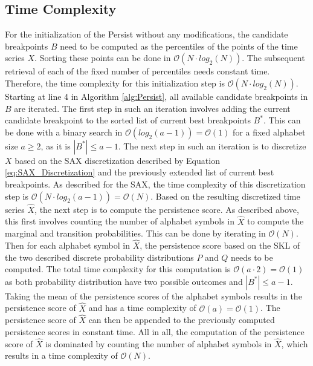 \subsection*{Time Complexity}
For the initialization of the Persist without any modifications, the candidate breakpoints $B$ need to be computed as the percentiles of the points of the time series $X$. Sorting these points can be done in $\mathcal{O}(N \cdot log_{2}(N))$. The subsequent retrieval of each of the fixed number of percentiles needs constant time. Therefore, the time complexity for this initialization step is $\mathcal{O}(N \cdot log_{2}(N))$. \newline
Starting at line 4 in Algorithm \ref{alg:Persist}, all available candidate breakpoints in $B$ are iterated.
The first step in such an iteration involves adding the current candidate breakpoint to the sorted list of current best breakpoints $B^*$. This can be done with a binary search in $\mathcal{O}(log_{2}(a-1)) = \mathcal{O}(1)$ for a fixed alphabet size $a \geq 2$, as it is $|B^*| \leq a-1$. \newline
The next step in such an iteration is to discretize $X$ based on the \ac{SAX} discretization described by Equation \ref{eq:SAX_Discretization} and the previously extended list of current best breakpoints. As described for the \ac{SAX}, the time complexity of this discretization step is $\mathcal{O}(N \cdot log_{2}(a-1)) = \mathcal{O}(N)$. \newline
Based on the resulting discretized time series $\hat{X}$, the next step is to compute the persistence score. As described above, this first involves counting the number of alphabet symbols in $\hat{X}$ to compute the marginal and transition probabilities. This can be done by iterating in $\mathcal{O}(N)$. Then for each alphabet symbol in $\hat{X}$, the persistence score based on the \ac{SKL} of the two described discrete probability distributions $P$ and $Q$ needs to be computed. The total time complexity for this computation is $\mathcal{O}(a \cdot 2) = \mathcal{O}(1)$ as both probability distribution have two possible outcomes and $|B^*| \leq a-1$. Taking the mean of the persistence scores of the alphabet symbols results in the persistence score of $\hat{X}$ and has a time complexity of $\mathcal{O}(a) = \mathcal{O}(1)$. The persistence score of $\hat{X}$ can then be appended to the previously computed persistence scores in constant time. All in all, the computation of the persistence score of $\hat{X}$ is dominated by counting the number of alphabet symbols in $\hat{X}$, which results in a time complexity of $\mathcal{O}(N)$. \newline
